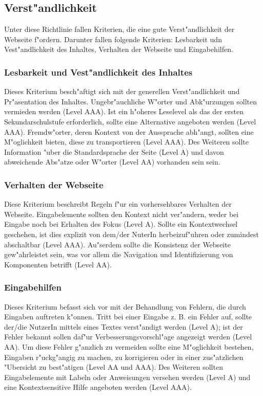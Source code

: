 \documentclass[a4paper,bibtotoc,oneside]{scrbook}
\begin{document}
\subsection{Verst"andlichkeit}
Unter diese Richtlinie fallen Kriterien, die eine gute Verst"andlichkeit der Webseite f"ordern. Darunter fallen folgende Kriterien: Lesbarkeit udn Vest"andlichkeit des Inhaltes, Verhalten der Webseite und Eingabehilfen. \cite[Abschnitt 3]{wcag2}

\subsubsection{Lesbarkeit und Vest"andlichkeit des Inhaltes}
Dieses Kriterium besch"aftigt sich mit der generellen Verst"andlichkeit und Pr"asentation des Inhaltes. Ungebr"auchliche W"orter und Abk"urzungen sollten vermieden werden (Level AAA). Ist ein h"oheres Leselevel als das der ersten Sekundarschulstufe erforderlich, sollte eine Alternative angeboten werden (Level AAA). Fremdw"orter, deren Kontext von der Aussprache abh"angt, sollten eine M"oglichkeit bieten, diese zu transportieren (Level AAA). Des Weiteren sollte Information "uber die Standardsprache der Seite (Level A) und davon abweichende Abs"atze oder W"orter (Level AA) vorhanden sein sein. \cite[Abschnitt 3.1]{wcag2}

\subsubsection{Verhalten der Webseite}
Diese Kriterium beschreibt Regeln f"ur ein vorhersehbares Verhalten der Webseite. Eingabelemente sollten den Kontext nicht ver"andern, weder bei Eingabe noch bei Erhalten des Fokus (Level A). Sollte ein Kontextwechsel geschehen, ist dies explizit von dem/der NuterIn herbeizuf"uhren oder zumindest abschaltbar (Level AAA). Au"serdem sollte die Konsistenz der Webseite gew"ahrleistet sein, was vor allem die Navigation und Identifizierung von Komponenten betrifft (Level AA). \cite[Abschnitt 3.2]{wcag2}

\subsubsection{Eingabehilfen}
Dieses Kriterium befasst sich vor mit der Behandlung von Fehlern, die durch Eingaben auftreten k"onnen. Tritt bei einer Eingabe z. B. ein Fehler auf, sollte der/die NutzerIn mittels eines Textes verst"andigt werden (Level A); ist der Fehler bekannt sollen daf"ur Verbesserungsvorschl"age angezeigt werden (Level AA). Um diese Fehler g"anzlich zu vermeiden sollte eine M"oglichkeit bestehen, Eingaben r"uckg"angig zu machen, zu korrigieren oder in einer zus"atzlichen "Ubersicht zu best"atigen (Level AA und AAA). Des Weiteren sollten Eingabelemente mit Labeln oder Anweisungen versehen werden (Level A) und eine Kontextsensitive Hilfe angeboten werden (Level AAA). \cite[Abschnitt 3.3]{wcag2}
\end{document}

